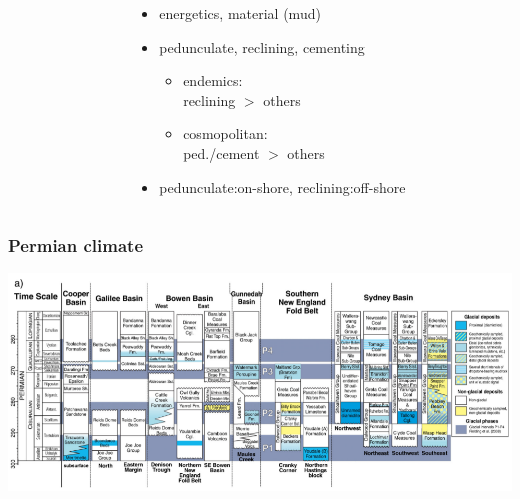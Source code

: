 \documentclass{beamer}
\begin{document}
\begin{frame}
\begin{columns}
\begin{column}{0.5\textwidth}
\begin{center}
        \tiny{}
      \end{center}
    \end{column}
    \begin{column}{0.5\textwidth}
      \begin{itemize}
        \item energetics, material (mud)
        \item pedunculate, reclining, cementing
          \begin{itemize}
            \item endemics: \\reclining \(>\) others
            \item cosmopolitan: \\ped./cement \(>\) others
          \end{itemize}
        \item pedunculate:on-shore, reclining:off-shore
      \end{itemize}
    \end{column}
  \end{columns}
\end{frame}

\begin{frame}
  \frametitle{Permian climate}
  \begin{center}
    \includegraphics[height = 0.8\textheight, width = \textwidth, keepaspectratio = true]{figure/glacial}

    \tiny{}
  \end{center}
\end{frame}
\end{document}
